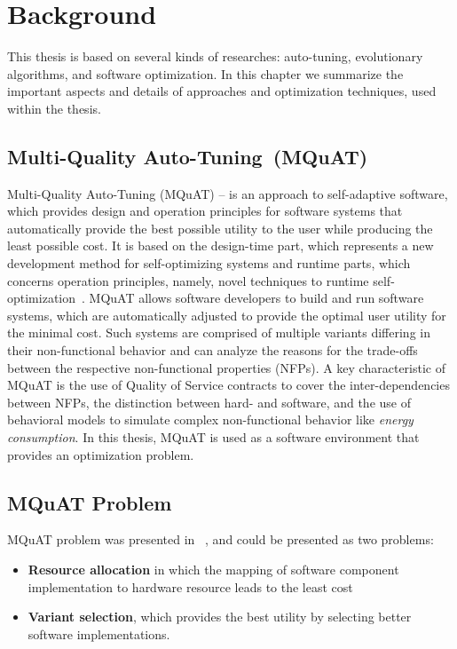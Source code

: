 \chapter{Background}
\label{chapter:background}
This thesis is based on several kinds of researches: auto-tuning, evolutionary algorithms, and software optimization. In this chapter we summarize the important aspects and details of approaches and optimization techniques, used within the thesis.  

\section{Multi-Quality Auto-Tuning~(MQuAT)}

Multi-Quality Auto-Tuning (MQuAT) – is an approach to self-adaptive software, which provides design and operation principles for software systems that automatically provide the best possible utility to the user while producing the least possible cost.
It is based on the design-time part, which represents a new development method for self-optimizing systems and runtime parts, which concerns operation principles, namely,  novel techniques to runtime self-optimization~\cite{gotz13}.
MQuAT allows software developers to build and run software systems, which are automatically adjusted to provide the optimal user utility for the minimal cost. Such systems are comprised of multiple variants differing in their non-functional behavior and can analyze the reasons for the trade-offs between the respective non-functional properties (NFPs).  A key characteristic of MQuAT is the use of Quality of Service contracts to cover the inter-dependencies between NFPs,  the distinction between hard- and software, and the use of behavioral models to simulate complex non-functional behavior like \textit{energy consumption}.
In this thesis, MQuAT is used as a software environment that provides an optimization problem.


\section{MQuAT Problem}
\label{sec:MQuATProblem}

MQuAT problem was presented in ~\cite{gotz18}, and could be presented as two problems:

\begin{itemize}
	\item \textbf{Resource allocation} in which the mapping of software component implementation to hardware resource leads to the least cost
	\item \textbf{Variant selection}, which provides the best utility by selecting better software implementations.
\end{itemize} 

